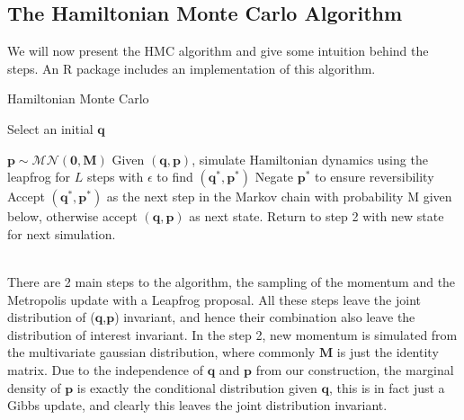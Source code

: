 \documentclass[11pt]{article}
\begin{document}



\pagebreak
\subsection{The Hamiltonian Monte Carlo Algorithm}
We will now present the HMC algorithm and give some intuition behind the steps. An R package includes an implementation of this algorithm. 
\begin{algorithm}
\caption{Hamiltonian Monte Carlo}\label{euclid}
\begin{algorithmic}[1] 
\State Select an initial $\mathbf{q}$ 

\State $\mathbf{p}\sim \mathcal{MN}(\mathbf{0},\mathbf{M})$
\State Given $(\mathbf{q},\mathbf{p})$, simulate Hamiltonian dynamics using the leapfrog for $L$ steps with $\epsilon$ to find $(\mathbf{q^{*}},\mathbf{p^{*}})$ 
\State Negate $\mathbf{p^{*}}$ to ensure reversibility 
\State Accept $(\mathbf{q^{*}}, \mathbf{p^{*}})$ as the next step in the Markov chain with probability M given below, otherwise accept $(\mathbf{q},\mathbf{p})$ as next state.
\State Return to step 2 with new state for next simulation.
\end{algorithmic}
\end{algorithm}\\
\noindent There are 2 main steps to the algorithm, the sampling of the momentum and the Metropolis update with a Leapfrog proposal. All these steps leave the joint distribution of ($\mathbf{q}$,$\mathbf{p}$) invariant, and hence their combination also leave the distribution of interest invariant. In the step 2, new momentum is simulated from the multivariate gaussian distribution, where commonly $\mathbf{M}$ is just the identity matrix. Due to the independence of $\mathbf{q}$ and $\mathbf{p}$ from our construction, the marginal density of $\mathbf{p}$ is exactly the conditional distribution given $\mathbf{q}$, this is in fact just a Gibbs update, and clearly this leaves the joint distribution invariant. 
\end{document}
